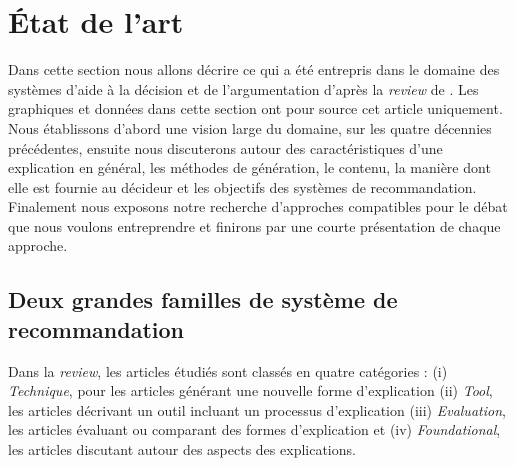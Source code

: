 \documentclass[a4paper, 11pt]{article}
\begin{document}
\begin{comment}



\textcolor{blue}{to do : convenir d'un protocole de dialogue entre les modèles et le décideur, le role de chacun et introduire ici le schéma}

\end{comment}

\section{État de l'art}

Dans cette section nous allons décrire ce qui a été entrepris dans le domaine des systèmes d'aide à la décision et de l'argumentation d'après la \textit{review} de \textcolor{blue}{\citep{NunesJannachUmuai2017}}. Les graphiques et données dans cette section ont pour source cet article uniquement. 
Nous établissons d'abord une vision large du domaine, sur les quatre décennies précédentes, ensuite nous discuterons autour des caractéristiques d'une explication en général, les méthodes de génération, le contenu, la manière dont elle est fournie au décideur et les objectifs des systèmes de recommandation. Finalement nous exposons notre recherche d'approches compatibles pour le débat que nous voulons entreprendre et finirons par une courte présentation de chaque approche.

\subsection{Deux grandes familles de système de recommandation}

Dans la \textit{review}, les articles étudiés sont classés en quatre catégories : (i) \textit{Technique}, pour les articles générant une nouvelle forme d'explication (ii) \textit{Tool}, les articles décrivant un outil incluant un processus d'explication (iii) \textit{Evaluation}, les articles évaluant ou comparant des formes d'explication et (iv) \textit{Foundational}, les articles discutant autour des aspects des explications.
\end{document}
